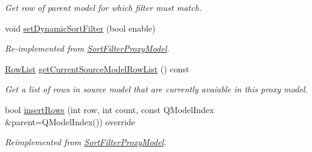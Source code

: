 \begin{DoxyCompactItemize}
\begin{DoxyCompactList}\small\item\em Get row of parent model for which filter must match. \end{DoxyCompactList}\item 
void \hyperlink{class_mdt_1_1_item_model_1_1_relation_filter_proxy_model_a456161ed9ab45cf02d6c2ff944e94a5d}{set\+Dynamic\+Sort\+Filter} (bool enable)\hypertarget{class_mdt_1_1_item_model_1_1_relation_filter_proxy_model_a456161ed9ab45cf02d6c2ff944e94a5d}{}\label{class_mdt_1_1_item_model_1_1_relation_filter_proxy_model_a456161ed9ab45cf02d6c2ff944e94a5d}

\begin{DoxyCompactList}\small\item\em Re-\/implemented from \hyperlink{class_mdt_1_1_item_model_1_1_sort_filter_proxy_model}{Sort\+Filter\+Proxy\+Model}. \end{DoxyCompactList}\item 
\hyperlink{class_mdt_1_1_item_model_1_1_row_list}{Row\+List} \hyperlink{class_mdt_1_1_item_model_1_1_relation_filter_proxy_model_ab197a1d62da5b2fc1a6a6ba167a4aae5}{get\+Current\+Source\+Model\+Row\+List} () const \hypertarget{class_mdt_1_1_item_model_1_1_relation_filter_proxy_model_ab197a1d62da5b2fc1a6a6ba167a4aae5}{}\label{class_mdt_1_1_item_model_1_1_relation_filter_proxy_model_ab197a1d62da5b2fc1a6a6ba167a4aae5}

\begin{DoxyCompactList}\small\item\em Get a list of rows in source model that are currently avaiable in this proxy model. \end{DoxyCompactList}\item 
bool \hyperlink{class_mdt_1_1_item_model_1_1_relation_filter_proxy_model_ab3ca677bfc3a9ef2fc1ac7342b81f499}{insert\+Rows} (int row, int count, const Q\+Model\+Index \&parent=Q\+Model\+Index()) override\hypertarget{class_mdt_1_1_item_model_1_1_relation_filter_proxy_model_ab3ca677bfc3a9ef2fc1ac7342b81f499}{}\label{class_mdt_1_1_item_model_1_1_relation_filter_proxy_model_ab3ca677bfc3a9ef2fc1ac7342b81f499}

\begin{DoxyCompactList}\small\item\em Reimplemented from \hyperlink{class_mdt_1_1_item_model_1_1_sort_filter_proxy_model}{Sort\+Filter\+Proxy\+Model}. \end{DoxyCompactList}\end{DoxyCompactItemize}


